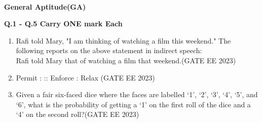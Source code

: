 \documentclass[a4paper,12pt]{exam}
\theoremstyle{remark}
\begin{document}
\vspace{0.5cm}\\
\raggedright{\textbf{General Aptitude(GA)}}\\
\vspace{0.5cm}
\raggedright{\textbf{Q.1 - Q.5 Carry ONE mark Each}}
\begin{enumerate}
\item Rafi told Mary, "I am thinking of watching a film this weekend." 
The following reports on the above statement in indirect speech:\\ Rafi told Mary that 
\underline{\hspace{2cm}} of watching a film that weekend.\hfill{(GATE EE 2023)}
\begin{enumerate}
\end{enumerate}

\item Permit : \underline{\hspace{2cm}} :: Enforce : Relax \hfill{(GATE EE 2023)}\\
\begin{enumerate}
\end{enumerate}

\item Given a fair six-faced dice where the faces are labelled `1', `2', `3', `4', `5', and `6', what is the probability of getting a `1' on the first roll of the dice and a `4' on the second roll?\hfill{(GATE EE 2023)}
\begin{enumerate}
\end{enumerate}


\end{enumerate}
\end{document}
